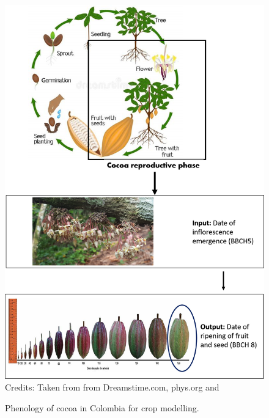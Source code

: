 \documentclass[gene,journal,article,submit,moreauthors,pdftex]{Definitions/mdpi}
\begin{document}
 
\begin{figure}[h!]
	\centering
	\caption{\footnotesize {Phenology of cocoa in Colombia for crop modelling.\\}} 
	\includegraphics[scale=0.3]{images/phenology.png}\\
	\footnotesize{Credits: Taken from from Dreamstime.com, phys.org \citep{toledo2021} and \cite{lopez2018}}
	\label{fig:pheno}
\end{figure}
\end{document}
